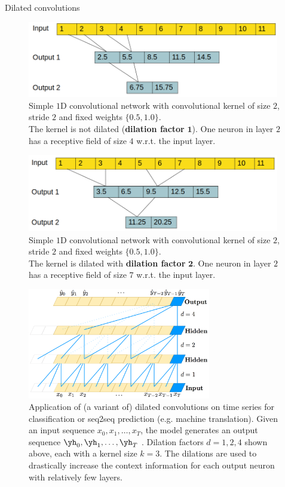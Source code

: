 \begin{vbframe}{Dilated convolutions}
\framebreak 

    \vspace*{0.5cm}
    \begin{figure}
        \centering
        \includegraphics[width=11cm]{figure/dilatedconv-4.png}
        \caption{Simple $1$D convolutional network with convolutional kernel of size $2$, stride $2$ and fixed weights $\{0.5, 1.0\}$. \\ The kernel is not dilated (\textbf{dilation factor} $\mathbf{1}$). One neuron in layer $2$ has a receptive field of size $4$ w.r.t. the input layer. }
    \end{figure}
\framebreak 
    \vspace*{0.5cm}
    \begin{figure}
        \centering
        \includegraphics[width=11cm]{figure/dilatedconv-5.png}
        \caption{Simple $1$D convolutional network with convolutional kernel of size $2$, stride $2$ and fixed weights $\{0.5, 1.0\}$. \\ The kernel is dilated with \textbf{dilation factor} $\mathbf{2}$. One neuron in layer $2$ has a receptive field of size $7$ w.r.t. the input layer. }
    \end{figure}
    
\framebreak 

    \begin{figure}
        \centering
        \includegraphics[width=8cm]{plots/05_conv_variations/dilated/tcn.png}
        \caption{Application of (a variant of) dilated convolutions on time series for classification or seq2seq prediction (e.g. machine translation). Given an input sequence $x_0,x_1, \ldots, x_T$, the model generates an output sequence $\yh_0,\yh_1, \ldots, \yh_T$ . Dilation factors $d = 1, 2, 4$ shown above, each with a kernel size $k = 3$. The dilations are used to drastically increase the context information for each output neuron with relatively few layers.}
    \end{figure}

\end{vbframe}
